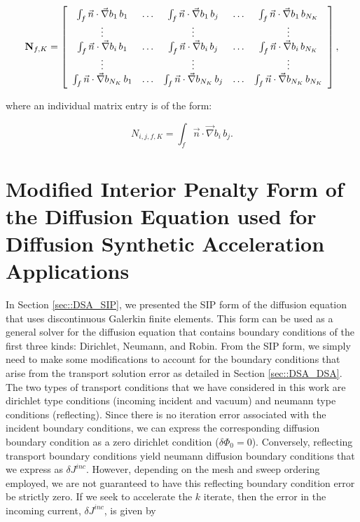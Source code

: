 \begin{equation}
\label{eq::DSA_surface_gradient_matrix_array}
{\bf N}_{f,K} =   \left[
\begin{array} {ccccc}
	\int_f \vec{n} \cdot\vec{\nabla}  b_1 \, b_1  & \ldots & \int_f \vec{n} \cdot \vec{\nabla} b_1 \, b_j  & \ldots & \int_f \vec{n} \cdot \vec{\nabla} b_1 \, b_{N_K} \\
	\vdots  &  & \vdots  &  & \vdots \\
	\int_f \vec{n}\cdot  \vec{\nabla} b_i \, b_1  & \ldots & \int_f \vec{n} \cdot\vec{\nabla}  b_i \, b_j  & \ldots & \int_f \vec{n}\cdot\vec{\nabla}  b_i \, b_{N_K} \\
	\vdots  &  & \vdots  &  & \vdots \\
	\int_f \vec{n} \cdot  \vec{\nabla} b_{N_K} \, b_1  & \ldots & \int_f \vec{n} \cdot  \vec{\nabla} b_{N_K} \, b_j  & \ldots & \int_f \vec{n} \cdot \vec{\nabla}  b_{N_K} \, b_{N_K} \\
\end{array}
\right] ,
\end{equation}

\noindent where an individual matrix entry is of the form:

\begin{equation}
\label{eq::DSA_surface_gradient_matrix_entry}
N_{i,j,f,K} =  \int_f \vec{n} \cdot  \vec{\nabla} b_i \, b_j .
\end{equation}

\section{Modified Interior Penalty Form of the Diffusion Equation used for Diffusion Synthetic Acceleration Applications}
\label{sec::DSA_MIP}

In Section \ref{sec::DSA_SIP}, we presented the SIP form of the diffusion equation that uses discontinuous Galerkin finite elements. This form can be used as a general solver for the diffusion equation that contains boundary conditions of the first three kinds: Dirichlet, Neumann, and Robin. From the SIP form, we simply need to make some modifications to account for the boundary conditions that arise from the transport solution error as detailed in Section \ref{sec::DSA_DSA}. The two types of transport conditions that we have considered in this work are dirichlet type conditions (incoming incident and vacuum) and neumann type conditions (reflecting). Since there is no iteration error associated with the incident boundary conditions, we can express the corresponding diffusion boundary condition as a zero dirichlet condition ($\delta \Phi_0 = 0$). Conversely, reflecting transport boundary conditions yield neumann diffusion boundary conditions that we express as $\delta J^{inc}$. However, depending on the mesh and sweep ordering employed, we are not guaranteed to have this reflecting boundary condition error be strictly zero. If we seek to accelerate the $k$ iterate, then the error in the incoming current, $\delta J^{inc}$, is given by

